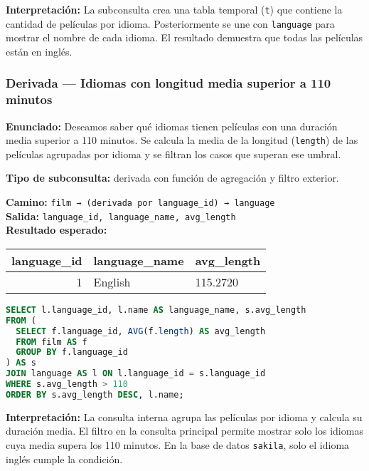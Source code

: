 \documentclass[12pt,a4paper]{article}
\begin{document}
\vspace{0.5em}
\textbf{Interpretación:}  
La subconsulta crea una tabla temporal (\texttt{t}) que contiene la cantidad de películas por idioma.  
Posteriormente se une con \texttt{language} para mostrar el nombre de cada idioma.  
El resultado demuestra que todas las películas están en inglés.

\subsubsection*{Derivada — Idiomas con longitud media superior a 110 minutos}
\textbf{Enunciado:}  
Deseamos saber qué idiomas tienen películas con una duración media superior a 110 minutos.  
Se calcula la media de la longitud (\texttt{length}) de las películas agrupadas por idioma y se filtran los casos que superan ese umbral.

\textbf{Tipo de subconsulta:} derivada con función de agregación y filtro exterior.

\textbf{Camino:} \texttt{film → (derivada por language\_id) → language}\\
\textbf{Salida:} \texttt{language\_id, language\_name, avg\_length}\\

\textbf{Resultado esperado:}

\begin{center}
\begin{tabular}{rll}
\toprule
\textbf{language\_id} & \textbf{language\_name} & \textbf{avg\_length} \\
\midrule
1 & English & 115.2720 \\
\bottomrule
\end{tabular}
\end{center}

\begin{lstlisting}[language=SQL]
SELECT l.language_id, l.name AS language_name, s.avg_length
FROM (
  SELECT f.language_id, AVG(f.length) AS avg_length
  FROM film AS f
  GROUP BY f.language_id
) AS s
JOIN language AS l ON l.language_id = s.language_id
WHERE s.avg_length > 110
ORDER BY s.avg_length DESC, l.name;
\end{lstlisting}

\vspace{0.5em}
\textbf{Interpretación:}  
La consulta interna agrupa las películas por idioma y calcula su duración media.  
El filtro en la consulta principal permite mostrar solo los idiomas cuya media supera los 110 minutos.  
En la base de datos \texttt{sakila}, solo el idioma inglés cumple la condición.
\end{document}

